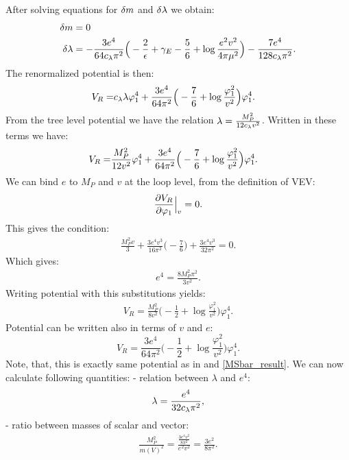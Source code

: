 After solving equations for $\delta m$ and $\delta\lambda$ we obtain:
\begin{align}
\delta m &= 0 \\
\delta\lambda &= -\frac{3e^4}{64c_\lambda\pi^2}\Big(-\frac{2}{\epsilon}+\gamma_E-\frac{5}{6}+
\log\frac{e^2v^2}{4\pi\mu^2}\Big)-\frac{7e^4}{128c_\lambda\pi^2}.
\end{align}
The renormalized potential is then:
\begin{align}
V_R = &c_\lambda\lambda\varphi_1^4 +
\frac{3e^4}{64\pi^2}\Big(-\frac{7}{6}+\log\frac{\varphi_1^2}{v^2}\Big)\varphi_1^4.
\end{align}
From the tree level potential we have the relation $\lambda = \frac{M_P^2}{12c_\lambda v^2}$. 
Written in these terms we have:
\begin{align}
V_R = &\frac{M_P^2}{12v^2}\varphi_1^4 +
\frac{3e^4}{64\pi^2}\Big(-\frac{7}{6}+\log\frac{\varphi_1^2}{v^2}\Big)\varphi_1^4.
\end{align}
We can bind $e$ to $M_P$ and $v$ at the loop level, from the definition of VEV:
\begin{align}
\frac{\partial V_R}{\partial \varphi_1} \Big|_v= 0.
\end{align}
This gives the condition:
\begin{align}
\frac{M_P^2v}{3}+\frac{3e^4v^3}{16\pi^2}\Big(-\frac{7}{6}\Big)+\frac{3e^4v^3}{32\pi^2}=0.
\end{align}
Which gives:
\begin{align}
e^4 = \frac{8M_P^2\pi^2}{3v^2}.
\end{align}
Writing potential with this substitutions yields:
\begin{align}
V_R = \frac{M_P^2}{8v^2}\Big(-\frac{1}{2}+\log\frac{\varphi_1^2}{v^2}\Big)\varphi_1^4.
\end{align}
Potential can be written also in terms of $v$ and $e$:
\begin{equation}
V_R=\frac{3e^4}{64\pi^2}\Big(-\frac{1}{2}+\log\frac{\varphi_1^2}{v^2}\Big)\varphi_1^4.
\end{equation}
Note, that, this is exactly same potential as in \cite{Coleman1973} and \ref{MSbar_result}. 
We can now calculate following quantities:
\hspace*{0.5cm}- relation between $\lambda$ and $e^4$:
\begin{align}
\lambda = \frac{e^4}{32c_\lambda\pi^2},
\end{align}
\hspace*{0.5cm}- ratio between masses of scalar and vector:
\begin{align}
\frac{M_P^2}{m(V)^2} = \frac{\frac{3e^4v^2}{8\pi^2}}{e^2v^2} = \frac{3e^2}{8\pi^2}.
\end{align}



